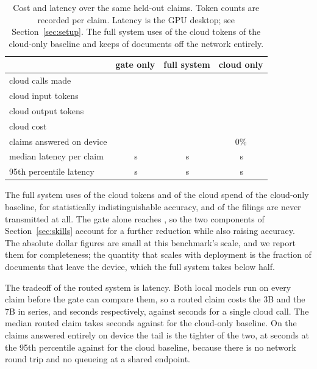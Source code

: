 \documentclass{article}
\begin{document}
\begin{table}[t]
\caption{Cost and latency over the same \nTest{} held-out claims. Token counts are recorded
per claim. Latency is the GPU desktop; see Section~\ref{sec:setup}. The full system uses
\tokenRatioFull{} of the cloud tokens of the cloud-only baseline and keeps
\fullOnDeviceRate{} of documents off the network entirely.}
\label{tab:cost}
\centering
\begin{tabular}{lccc}
\toprule
 & gate only & \textbf{full system} & cloud only \\
\midrule
cloud calls made              & \cloudCalls{}        & \textbf{\fullCloudCalls{}}   & \nTest{} \\
cloud input tokens            & \tokensRoutedIn{}    & \tokensFullIn{}    & \tokensCloudIn{} \\
cloud output tokens           & \tokensRoutedOut{}   & \tokensFullOut{}   & \tokensCloudOut{} \\
cloud cost                    & \costRouted{}        & \textbf{\costFull{}}        & \costCloud{} \\
claims answered on device     & \onDeviceRate{}      & \textbf{\fullOnDeviceRate{}} & 0\% \\
\midrule
median latency per claim      & \latRoutedMed{}\,s   & \latFullMed{}\,s   & \latCloudMed{}\,s \\
95th percentile latency       & \latRoutedPFive{}\,s & \latFullPFive{}\,s & \latCloudPFive{}\,s \\
\bottomrule
\end{tabular}
\end{table}

The full system uses \tokenRatioFull{} of the cloud tokens and \costRatioFull{} of the cloud
spend of the cloud-only baseline, for statistically indistinguishable accuracy, and
\fullOnDeviceRate{} of the filings are never transmitted at all. The gate alone reaches
\costRatio{}, so the two components of Section~\ref{sec:skills} account for a further
reduction while also raising accuracy. The absolute dollar figures are small at this
benchmark's scale, and we report them for completeness; the quantity that scales with
deployment is the fraction of documents that leave the device, which the full system takes
below half.

The tradeoff of the routed system is latency. Both local models run on every claim before
the gate can compare them, so a routed claim costs the 3B and the 7B in series,
\latThreeBMed{} and \latSevenBMed{} seconds respectively, against \latCloudStageMed{}
seconds for a single cloud call. The median routed claim takes \latRoutedMed{} seconds
against \latCloudMed{} for the cloud-only baseline. On the claims answered entirely on
device the tail is the tighter of the two, at \latKeptLocalPFive{} seconds at the 95th
percentile against \latCloudPFive{} for the cloud baseline, because there is no network
round trip and no queueing at a shared endpoint.
\end{document}
